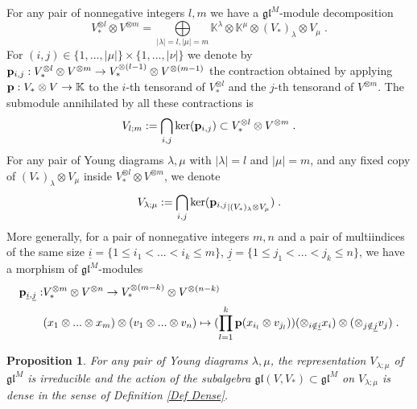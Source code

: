 \documentclass[12pt]{article}
\def\KK {{\mathbb K}}     %
\def\mk {\mathfrak}
\def\ul  {\underline}
\newtheorem{prop}[theorem]{Proposition}
\begin{document}
For any pair of nonnegative integers $l,m$ we have a $\mk{gl}^M$-module decomposition
$$
V_*^{\otimes l}\otimes V^{\otimes m} = \bigoplus\limits_{|\lambda|=l,|\mu|=m} \KK^\lambda\otimes \KK^\mu\otimes (V_*)_\lambda\otimes V_\mu \;.
$$
For $(i,j)\in\{1,...,|\mu|\}\times\{1,...,|\nu|\}$ we denote by ${\bf p}_{i,j}:V_*^{\otimes l}\otimes V^{\otimes m}\to V_*^{\otimes(l-1)}\otimes V^{\otimes(m-1)}$ the contraction obtained by applying ${\bf p}:V_*\otimes V\to \KK$ to the $i$-th tensorand of $V_*^{\otimes l}$ and the $j$-th tensorand of $V^{\otimes m}$. The submodule annihilated by all these contractions is
$$
V_{l;m} := \bigcap\limits_{i,j} {\rm ker}({\bf p}_{i,j}) \subset V_*^{\otimes l}\otimes V^{\otimes m} \;.
$$
For any pair of Young diagrams $\lambda,\mu$ with $|\lambda|=l$ and $|\mu|=m$, and any fixed copy of $(V_*)_\lambda\otimes V_\mu$ inside $V_*^{\otimes l}\otimes V^{\otimes m}$, we denote
$$
V_{\lambda;\mu} := \bigcap\limits_{i,j} {\rm ker}({{\bf p}_{i,j}}_{\vert (V_*)_\lambda\otimes V_\mu}) \;.
$$
More generally, for a pair of nonnegative integers $m,n$ and a pair of multiindices of the same size $\ul{i}=\{1\leq i_1<...<i_k\leq m\}$, $\ul{j}=\{1\leq j_1<...<j_k\leq n\}$, we have a morphism of $\mk{gl}^M$-modules
\begin{align*}
{\bf p}_{\ul{i},\ul{j}}: & V_*^{\otimes m}\otimes V^{\otimes n}\to V_*^{\otimes (m-k)}\otimes V^{\otimes (n-k)} \\
 & (x_1\otimes ... \otimes x_m) \otimes (v_1\otimes ...\otimes v_n) \mapsto (\prod\limits_{l=1}^k{\bf p}(x_{i_l}\otimes v_{j_l})) (\otimes_{i\notin \ul{i}} x_i)\otimes (\otimes_{j\notin\ul{j}} v_j) \;.
\end{align*}

\begin{prop}\label{Prop DenseVlambdamu PS}
For any pair of Young diagrams $\lambda,\mu$, the representation $V_{\lambda;\mu}$ of $\mk{gl}^M$ is irreducible and the action of the subalgebra $\mk{gl}(V,V_*)\subset\mk{gl}^M$ on $V_{\lambda;\mu}$ is dense in the sense of Definition \ref{Def Dense}.
\end{prop}
\end{document}
